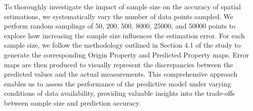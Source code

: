 \documentclass{swmcmthesis}
\begin{document}
To thoroughly investigate the impact of sample size on the accuracy of spatial estimations, we systematically vary the number of data points sampled. We perform random samplings of 50, 200, 500, 8000, 25000, and 50000 points to explore how increasing the sample size influences the estimation error. For each sample size, we follow the methodology outlined in Section 4.1 of the study to generate the corresponding Origin Property and Predicted Property maps. Error maps are then produced to visually represent the discrepancies between the predicted values and the actual measurements. This comprehensive approach enables us to assess the performance of the predictive model under varying conditions of data availability, providing valuable insights into the trade-offs between sample size and prediction accuracy.

\begin{figure}[h!t]
\centering
{}


\end{figure}
\end{document}
